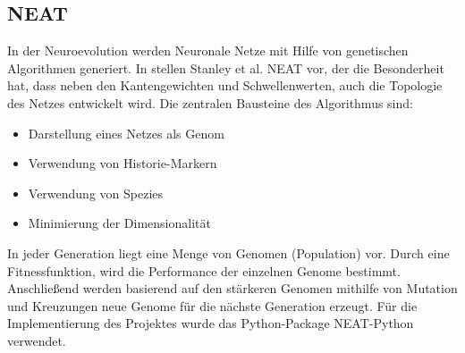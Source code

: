 \documentclass[11pt,final,journal,a4paper,towside,towcolumn]{IEEEtran}
\begin{document}
\subsection{NEAT}
In der Neuroevolution werden Neuronale Netze mit Hilfe von genetischen Algorithmen generiert. In \cite{stanley:gecco02-efficient} stellen Stanley et al. \ac{NEAT} vor, der die Besonderheit hat, dass neben den Kantengewichten und Schwellenwerten, auch die Topologie des Netzes entwickelt wird.
Die zentralen Bausteine des Algorithmus sind:
\begin{itemize}
\item Darstellung eines Netzes als Genom	
\item Verwendung von Historie-Markern
\item Verwendung von Spezies
\item Minimierung der Dimensionalität
\end{itemize}
In jeder Generation liegt eine Menge von Genomen (Population) vor. Durch eine Fitnessfunktion, wird die Performance der einzelnen Genome bestimmt. Anschließend werden basierend auf den stärkeren Genomen mithilfe von Mutation und Kreuzungen neue Genome für die nächste Generation erzeugt. 
Für die Implementierung des Projektes wurde das Python-Package NEAT-Python \cite{python-neat} verwendet.
 


\end{document}
